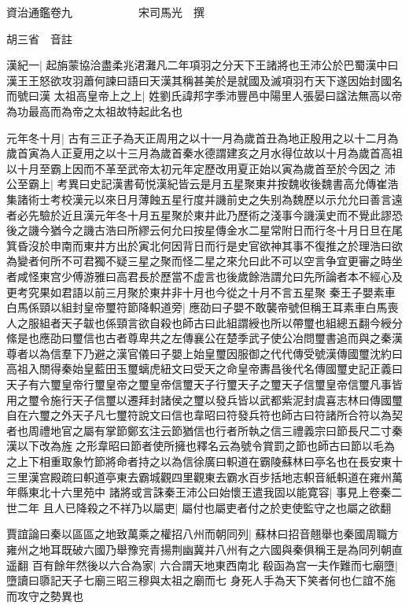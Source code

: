 資治通鑑卷九　　　　　　宋司馬光　撰

胡三省　音註

漢紀一|{
	起旃蒙協洽盡柔兆涒灘凡二年項羽之分天下王諸將也王沛公於巴蜀漢中曰漢王王怒欲攻羽蕭何諫曰語曰天漢其稱甚美於是就國及滅項羽冇天下遂因始封國名而號曰漢}
太祖高皇帝上之上|{
	姓劉氏諱邦字季沛豐邑中陽里人張晏曰諡法無高以帝為功最高而為帝之太祖故特起此名也}


元年冬十月|{
	古有三正子為天正周用之以十一月為歲首丑為地正殷用之以十二月為歲首寅為人正夏用之以十三月為歲首秦水德謂建亥之月水得位故以十月為歲首高祖以十月至霸上因而不革至武帝太初元年定歷改用夏正始以寅為歲首至於今因之}
沛公至霸上|{
	考異曰史記漢書荀悦漢紀皆云是月五星聚東井按魏收後魏書高允傳崔浩集諸術士考校漢元以來日月薄蝕五星行度并譏前史之失别為魏歷以示允允曰善言遠者必先驗於近且漢元年冬十月五星聚於東井此乃歷術之淺事今譏漢史而不覺此謬恐後之譏今猶今之譏古浩曰所繆云何允曰按星傳金水二星常附日而行冬十月日旦在尾箕昏沒於申南而東井方出於寅北何因背日而行是史官欲神其事不復推之於理浩曰欲為變者何所不可君獨不疑三星之聚而怪二星之來允曰此不可以空言争宜更審之時坐者咸怪東宫少傅游雅曰高君長於歷當不虚言也後歲餘浩謂允曰先所論者本不經心及更考究果如君語以前三月聚於東井非十月也今從之十月不言五星聚}
秦王子嬰素車白馬係頸以組封皇帝璽符節降軹道旁|{
	應劭曰子嬰不敢襲帝號但稱王耳素車白馬喪人之服組者天子韍也係頸言欲自殺也師古曰此組謂綬也所以帶璽也組總五翻今綬分絛是也應劭曰璽信也古者尊卑共之左傳襄公在楚季武子使公冶問璽書追而與之秦漢尊者以為信羣下乃避之漢官儀曰子嬰上始皇璽因服御之代代傳受號漢傳國璽沈約曰高祖入關得秦始皇藍田玉璽螭虎紐文曰受天之命皇帝夀昌後代名傳國璽史記正義曰天子有六璽皇帝行璽皇帝之璽皇帝信璽天子行璽天子之璽天子信璽皇帝信璽凡事皆用之璽令施行天子信璽以遷拜封諸侯之璽以發兵皆以武都紫泥封虞喜志林曰傳國璽自在六璽之外天子凡七璽符說文曰信也韋昭曰符發兵符也師古曰符諸所合符以為契者也周禮地官之屬有掌節鄭玄注云節猶信也行者所執之信三禮義宗曰節長尺二寸秦漢以下改為旌之形韋昭曰節者使所擁也釋名云為號令賞罰之節也師古曰節以毛為之上下相重取象竹節將命者持之以為信徐廣曰軹道在霸陵蘇林曰亭名也在長安東十三里漢宫殿疏曰軹道亭東去霸城觀四里觀東去霸水百步括地志軹音紙軹道在雍州萬年縣東北十六里苑中}
諸將或言誅秦王沛公曰始懷王遣我固以能寛容|{
	事見上卷秦二世二年}
且人已降殺之不祥乃以屬吏|{
	屬付也屬吏者付之於吏使監守之也屬之欲翻}


賈誼論曰秦以區區之地致萬乘之權招八州而朝同列|{
	蘇林曰招音翹舉也秦國周職方雍州之地耳既破六國乃舉豫兖青揚荆幽冀并八州有之六國與秦俱稱王是為同列朝直遥翻}
百有餘年然後以六合為家|{
	六合謂天地東西南北}
殽函為宫一夫作難而七廟墮|{
	墮讀曰隳記天子七廟三昭三穆與太祖之廟而七}
身死人手為天下笑者何也仁誼不施而攻守之勢異也

